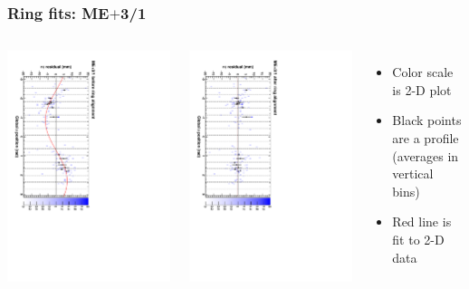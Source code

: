 \documentclass[compress]{beamer}
\begin{document}
\begin{frame}
\frametitle{Ring fits: ME$+$3/1}
\vfill
\begin{columns}
\includegraphics[height=\linewidth, angle=90]{ringfits_before/mep31.pdf}

\includegraphics[height=\linewidth, angle=90]{ringfits_after/mep31.pdf}
\begin{itemize}
\item Color scale is 2-D plot
\item Black points are a profile (averages in vertical bins)
\item Red line is fit to 2-D data
\end{itemize}
\end{columns}
\end{frame}
\end{document}
